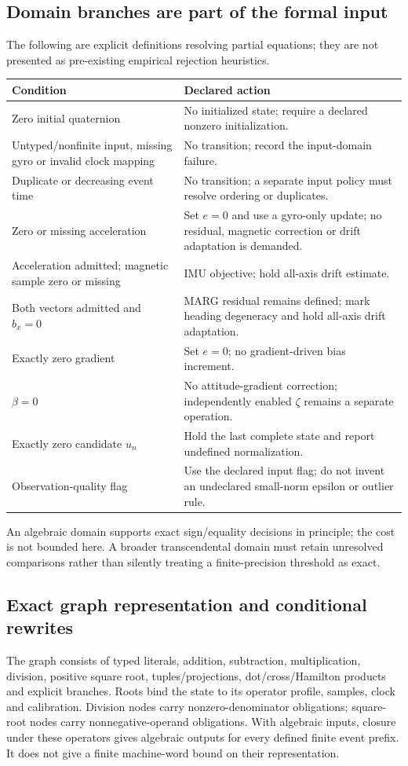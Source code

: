 \subsection{Domain branches are part of the formal input}
The following are explicit definitions resolving partial equations; they are
not presented as pre-existing empirical rejection heuristics.
\begin{center}\begin{tabularx}{\linewidth}{@{}>{\raggedright\arraybackslash}p{.34\linewidth}>{\raggedright\arraybackslash}X@{}}\toprule
Condition & Declared action\\\midrule
Zero initial quaternion & No initialized state; require a declared nonzero initialization.\\
Untyped/nonfinite input, missing gyro or invalid clock mapping & No transition; record the input-domain failure.\\
Duplicate or decreasing event time & No transition; a separate input policy must resolve ordering or duplicates.\\
Zero or missing acceleration & Set $e=0$ and use a gyro-only update; no residual, magnetic correction or drift adaptation is demanded.\\
Acceleration admitted; magnetic sample zero or missing & IMU objective; hold all-axis drift estimate.\\
Both vectors admitted and $b_x=0$ & MARG residual remains defined; mark heading degeneracy and hold all-axis drift adaptation.\\
Exactly zero gradient & Set $e=0$; no gradient-driven bias increment.\\
$\beta=0$ & No attitude-gradient correction; independently enabled $\zeta$ remains a separate operation.\\
Exactly zero candidate $u_n$ & Hold the last complete state and report undefined normalization.\\
Observation-quality flag & Use the declared input flag; do not invent an undeclared small-norm epsilon or outlier rule.\\\bottomrule
\end{tabularx}\end{center}
An algebraic domain supports exact sign/equality decisions in principle; the cost
is not bounded here. A broader transcendental domain must retain unresolved
comparisons rather than silently treating a finite-precision threshold as exact.

\subsection{Exact graph representation and conditional rewrites}
The graph consists of typed literals, addition, subtraction, multiplication,
division, positive square root, tuples/projections, dot/cross/Hamilton products
and explicit branches. Roots bind the state to its operator profile, samples,
clock and calibration. Division nodes carry nonzero-denominator obligations;
square-root nodes carry nonnegative-operand obligations. With algebraic inputs,
closure under these operators gives algebraic outputs for every defined finite
event prefix. It does not give a finite machine-word bound on their representation.

